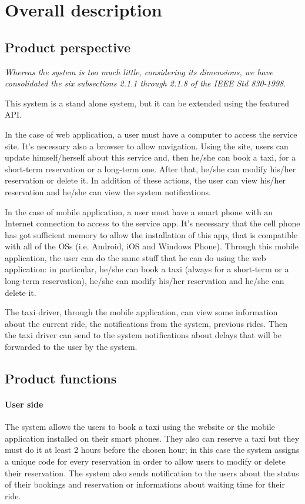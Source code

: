 \section{Overall description}
	\subsection{Product perspective}
		\emph{Whereas the system is too much little, considering its dimensions, we have consolidated the six subsections 2.1.1 through 2.1.8 of the IEEE Std 830-1998}.
		\vspace{10pt}
		
		This system is a stand alone system, but it can be extended using the featured API.
		
		In the case of web application, a user must have a computer to access the service site. It's necessary also a browser to allow navigation.
		Using the site, users can update himself/herself about this service and, then he/she can book a taxi, for a short-term reservation or a long-term one. After that, he/she can modify his/her reservation or delete it. In addition of these actions, the user can view his/her reservation and he/she can view the system notifications.
		
		In the case of mobile application, a user must have a smart phone with an Internet connection to access to the service app. It's necessary that the cell phone has got sufficient memory to allow the installation of this app, that is compatible with all of the OSs (i.e. Android, iOS and Windows Phone).
		Through this mobile application, the user can do the same stuff that he can do using the web application: in particular, he/she can book a taxi (always for a short-term or a long-term reservation), he/she can modify his/her reservation and he/she can delete it.
		
		The taxi driver, through the mobile application, can view some information about the current ride, the notifications from the system, previous rides. Then the taxi driver can send to the system notifications about delays that will be forwarded to the user by the system.
	\subsection{Product functions}
		\paragraph{User side}The system allows the users to book a taxi using the website or the mobile application installed on their smart phones. They also can reserve a taxi but they must do it at least 2 hours before the chosen hour; in this case the system assigns a unique code for every reservation in order to allow users to modify or delete their reservation. The system also sends notification to the users about the status of their bookings and reservation or informations about waiting time for their ride.
